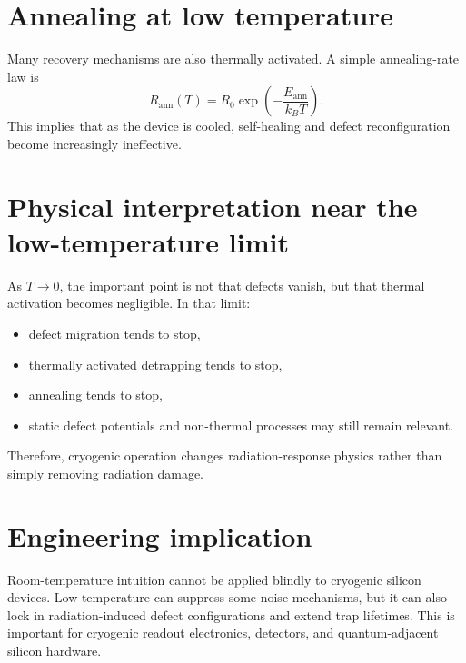 \documentclass[11pt]{article}
\begin{document}
\section*{Annealing at low temperature}
Many recovery mechanisms are also thermally activated. A simple annealing-rate law is
\[
R_{\mathrm{ann}}(T) = R_0 \exp\!\left(-\frac{E_{\mathrm{ann}}}{k_B T}\right).
\]
This implies that as the device is cooled, self-healing and defect reconfiguration become increasingly ineffective.

\section*{Physical interpretation near the low-temperature limit}
As $T \to 0$, the important point is not that defects vanish, but that thermal activation becomes negligible. In that limit:
\begin{itemize}
    \item defect migration tends to stop,
    \item thermally activated detrapping tends to stop,
    \item annealing tends to stop,
    \item static defect potentials and non-thermal processes may still remain relevant.
\end{itemize}

Therefore, cryogenic operation changes radiation-response physics rather than simply removing radiation damage.

\section*{Engineering implication}
Room-temperature intuition cannot be applied blindly to cryogenic silicon devices. Low temperature can suppress some noise mechanisms, but it can also lock in radiation-induced defect configurations and extend trap lifetimes. This is important for cryogenic readout electronics, detectors, and quantum-adjacent silicon hardware.
\end{document}
